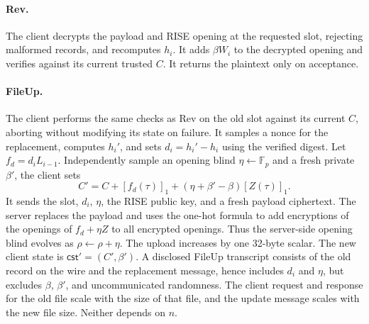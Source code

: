 \paragraph{Rev.}
The client decrypts the payload and RISE opening at the requested slot, rejecting malformed records, and recomputes $h_i$. It adds $\beta W_i$ to the decrypted opening and verifies against its current trusted $C$. It returns the plaintext only on acceptance.

\paragraph{FileUp.}
The client performs the same checks as Rev on the old slot against its current $C$, aborting without modifying its state on failure. It samples a nonce for the replacement, computes $h_i'$, and sets $d_i=h_i'-h_i$ using the verified digest. Let $f_d=d_iL_{i-1}$. Independently sample an opening blind $\eta\gets\mathbb F_p$ and a fresh private $\beta'$, the client sets
\[
 C'=C+[f_d(\tau)]_1+(\eta+\beta'-\beta)[Z(\tau)]_1.
\]
It sends the slot, $d_i$, $\eta$, the RISE public key, and a fresh payload ciphertext. The server replaces the payload and uses the one-hot formula to add encryptions of the openings of $f_d+\eta Z$ to all encrypted openings. Thus the server-side opening blind evolves as $\rho\leftarrow\rho+\eta$. The upload increases by one 32-byte scalar. The new client state is $\mathsf{cst}'=(C',\beta')$. A disclosed FileUp transcript consists of the old record on the wire and the replacement message, hence includes $d_i$ and $\eta$, but excludes $\beta$, $\beta'$, and uncommunicated randomness. The client request and response for the old file scale with the size of that file, and the update message scales with the new file size. Neither depends on $n$.

